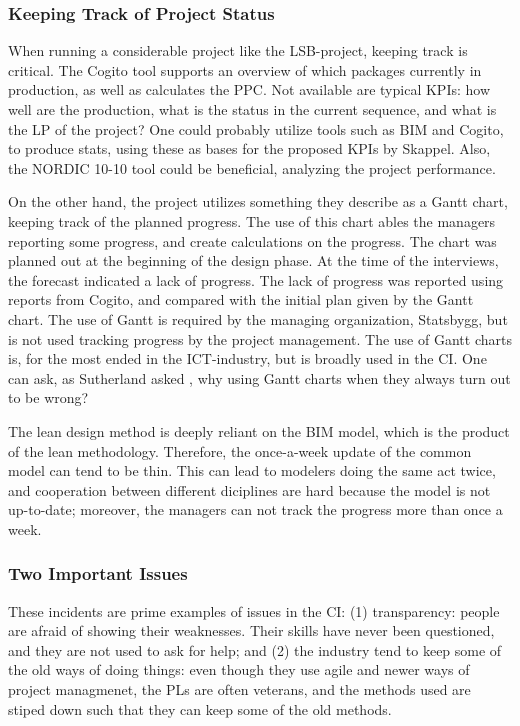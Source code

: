 \subsubsection{Keeping Track of Project Status}
When running a considerable project like the LSB-project, keeping track is critical. The Cogito tool supports an overview of which packages currently in production, as well as calculates the PPC. Not available are typical KPIs: how well are the production, what is the status in the current sequence, and what is the LP of the project? One could probably utilize tools such as BIM and Cogito, to produce stats, using these as bases for the proposed KPIs by Skappel. Also, the NORDIC 10-10 tool could be beneficial, analyzing the project performance.

On the other hand, the project utilizes something they describe as a Gantt chart, keeping track of the planned progress. The use of this chart ables the managers reporting some progress, and create calculations on the progress. The chart was planned out at the beginning of the design phase. At the time of the interviews, the forecast indicated a lack of progress. The lack of progress was reported using reports from Cogito, and compared with the initial plan given by the Gantt chart. The use of Gantt is required by the managing organization, Statsbygg, but is not used tracking progress by the project management. The use of Gantt charts is, for the most ended in the ICT-industry, but is broadly used in the CI. One can ask, as Sutherland asked \cite{sutherland}, why using Gantt charts when they always turn out to be wrong?

The lean design method is deeply reliant on the BIM model, which is the product of the lean methodology. Therefore, the once-a-week update of the common model can tend to be thin. This can lead to modelers doing the same act twice, and cooperation between different diciplines are hard because the model is not up-to-date; moreover, the managers can not track the progress more than once a week. 

\subsubsection{Two Important Issues}
These incidents are prime examples of issues in the CI: (1) transparency: people are afraid of showing their weaknesses. Their skills have never been questioned, and they are not used to ask for help; and (2) the industry tend to keep some of the old ways of doing things: even though they use agile and newer ways of project managmenet, the PLs are often veterans, and the methods used are stiped down such that they can keep some of the old methods.

